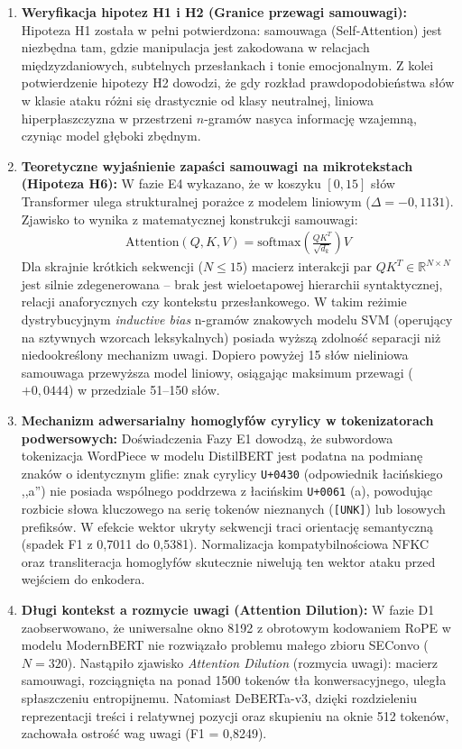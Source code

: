 \documentclass[12pt,a4paper,twoside]{report}
\begin{document}
\begin{enumerate}[leftmargin=1.5em]
  \item \textbf{Weryfikacja hipotez H1 i H2 (Granice przewagi samouwagi):} Hipoteza H1 została w pełni potwierdzona: samouwaga (Self-Attention) jest niezbędna tam, gdzie manipulacja jest zakodowana w relacjach międzyzdaniowych, subtelnych przesłankach i tonie emocjonalnym. Z kolei potwierdzenie hipotezy H2 dowodzi, że gdy rozkład prawdopodobieństwa słów w klasie ataku różni się drastycznie od klasy neutralnej, liniowa hiperpłaszczyzna w przestrzeni $n$-gramów nasyca informację wzajemną, czyniąc model głęboki zbędnym.

  \item \textbf{Teoretyczne wyjaśnienie zapaści samouwagi na mikrotekstach (Hipoteza H6):} W fazie E4 wykazano, że w koszyku $[0, 15]$ słów Transformer ulega strukturalnej porażce z modelem liniowym ($\Delta = -0,1131$). Zjawisko to wynika z matematycznej konstrukcji samouwagi:
  \begin{align}
    \text{Attention}(Q, K, V) = \text{softmax}\left(\frac{QK^T}{\sqrt{d_k}}\right)V
  \end{align}
  Dla skrajnie krótkich sekwencji ($N \le 15$) macierz interakcji par $QK^T \in \mathbb{R}^{N \times N}$ jest silnie zdegenerowana -- brak jest wieloetapowej hierarchii syntaktycznej, relacji anaforycznych czy kontekstu przesłankowego. W takim reżimie dystrybucyjnym \emph{inductive bias} n-gramów znakowych modelu SVM (operujący na sztywnych wzorcach leksykalnych) posiada wyższą zdolność separacji niż niedookreślony mechanizm uwagi. Dopiero powyżej 15 słów nieliniowa samouwaga przewyższa model liniowy, osiągając maksimum przewagi ($+0,0444$) w przedziale 51--150 słów.

  \item \textbf{Mechanizm adwersarialny homoglyfów cyrylicy w tokenizatorach podwersowych:} Doświadczenia Fazy E1 dowodzą, że subwordowa tokenizacja WordPiece w modelu DistilBERT jest podatna na podmianę znaków o identycznym glifie: znak cyrylicy \texttt{U+0430} (odpowiednik łacińskiego ,,a'') nie posiada wspólnego poddrzewa z łacińskim \texttt{U+0061} (a), powodując rozbicie słowa kluczowego na serię tokenów nieznanych (\texttt{[UNK]}) lub losowych prefiksów. W efekcie wektor ukryty sekwencji traci orientację semantyczną (spadek F1 z 0,7011 do 0,5381). Normalizacja kompatybilnościowa NFKC oraz transliteracja homoglyfów skutecznie niwelują ten wektor ataku przed wejściem do enkodera.

  \item \textbf{Długi kontekst a rozmycie uwagi (Attention Dilution):} W fazie D1 zaobserwowano, że uniwersalne okno 8192 z obrotowym kodowaniem RoPE w modelu ModernBERT nie rozwiązało problemu małego zbioru SEConvo ($N=320$). Nastąpiło zjawisko \emph{Attention Dilution} (rozmycia uwagi): macierz samouwagi, rozciągnięta na ponad 1500 tokenów tła konwersacyjnego, uległa spłaszczeniu entropijnemu. Natomiast DeBERTa-v3, dzięki rozdzieleniu reprezentacji treści i relatywnej pozycji oraz skupieniu na oknie 512 tokenów, zachowała ostrość wag uwagi (F1 = 0,8249).


\end{enumerate}
\end{document}
